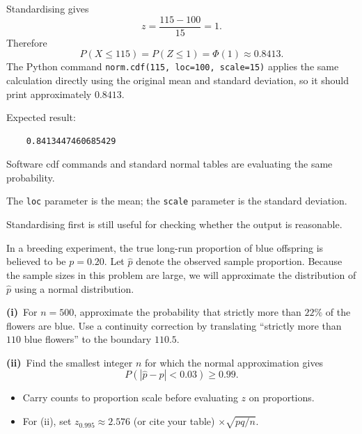 \begin{solution}
Standardising gives
\[
z=\frac{115-100}{15}=1.
\]
Therefore
\[
P(X\le115)=P(Z\le1)=\Phi(1)\approx0{.}8413.
\]
The Python command \texttt{norm.cdf(115, loc=100, scale=15)} applies the same calculation directly using the original mean and standard deviation, so it should print approximately $0{.}8413$.


Expected result: 

\begin{verbatim}
    0.8413447460685429
\end{verbatim}

\end{solution}

\begin{takeaways}
\item Software cdf commands and standard normal tables are evaluating the same probability.
\item The \texttt{loc} parameter is the mean; the \texttt{scale} parameter is the standard deviation.
\item Standardising first is still useful for checking whether the output is reasonable.
\end{takeaways}

\begin{problem}
In a breeding experiment, the true long-run proportion of blue offspring is believed to be $p=0{.}20$. Let $\hat p$ denote the observed sample proportion. Because the sample sizes in this problem are large, we will approximate the distribution of $\hat p$ using a normal distribution.

\textbf{(i)}\ For $n=500$, approximate the probability that strictly more than $22\%$ of the flowers are blue. Use a continuity correction by translating ``strictly more than $110$ blue flowers'' to the boundary $110{.}5$.

\textbf{(ii)}\ Find the smallest integer $n$ for which the normal approximation gives
\[
P(|\hat p-p|<0{.}03)\ge0{.}99.
\]

\end{problem}

\begin{hint}
\begin{itemize}[leftmargin=*]
\item Carry counts to proportion scale before evaluating $z$ on proportions.
\item For (ii), set $z_{0{.}995}\approx 2{.}576$ (or cite your table) $\times\sqrt{pq/n}$.
\end{itemize}
\end{hint}

